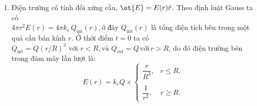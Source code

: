 \begin{loigiai}
   \begin{enumerate}[1)]
  \item Điện trường có tính đối xứng cầu, $\ot{E} = E(r) {\hat{r}}$. Theo định luật Gauss ta có\\ $4\pi r^2E(r) = 4\pi k_e \,Q_{\mathrm{int}}(r), \text{ở đây}\,\, Q_{\mathrm{int}}(r)$ là tổng điện tích bên trong một quả cầu bán kính $r$. Ở thời điểm $t=0$ ta có $Q_{\mathrm{int}} = Q(r/R)^3 \,\,\text{với}\,\, r<R, \text{và}\,\, Q_{int} =Q \,\text{với}\, r>R$, do đó điện trường bên trong đám mây lần lượt là:
        \[E(r) = k_e Q\times \left\{ \begin{array}{ll} 
                                        \dfrac{r}{R^3}, & r\leq R, \\
                                        \\
                             \dfrac{1}{r^2}, &r\geq R. \end{array} \right. \tag{1}  \]


\end{enumerate}
\end{loigiai}
